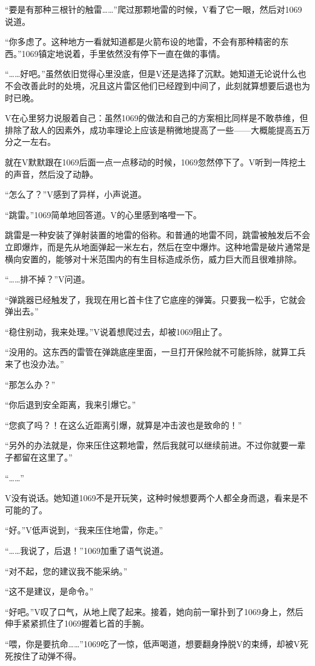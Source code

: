 “要是有那种三根针的触雷……”爬过那颗地雷的时候，V看了它一眼，然后对1069说道。

“你多虑了。这种地方一看就知道都是火箭布设的地雷，不会有那种精密的东西。”1069镇定地说着，手里依然没有停下一直在做的事情。

“……好吧。”虽然依旧觉得心里没底，但是V还是选择了沉默。她知道无论说什么也不会改善此时的处境，况且这片雷区他们已经蹚到中间了，此刻就算想要后退也为时已晚。

V在心里努力说服着自己：虽然1069的做法和自己的方案相比同样是不敢恭维，但排除了敌人的因素外，成功率理论上应该是稍微地提高了一些——大概能提高五万分之一左右。

就在V默默跟在1069后面一点一点移动的时候，1069忽然停下了。V听到一阵挖土的声音，然后没了动静。

“怎么了？”V感到了异样，小声说道。

“跳雷。”1069简单地回答道。V的心里感到咯噔一下。

跳雷是一种安装了弹射装置的地雷的俗称。和普通的地雷不同，跳雷被触发后不会立即爆炸，而是先从地面弹起一米左右，然后在空中爆炸。这种地雷是破片通常是横向安置的，能够对十米范围内的有生目标造成杀伤，威力巨大而且很难排除。

“……排不掉？”V问道。

“弹跳器已经触发了，我现在用匕首卡住了它底座的弹簧。只要我一松手，它就会弹出去。”

“稳住别动，我来处理。”V说着想爬过去，却被1069阻止了。

“没用的。这东西的雷管在弹跳底座里面，一旦打开保险就不可能拆除，就算工兵来了也没办法。”

“那怎么办？”

“你后退到安全距离，我来引爆它。”

“您疯了吗？！在这么近距离引爆，就算是冲击波也是致命的！”

“另外的办法就是，你来压住这颗地雷，然后我就可以继续前进。不过你就要一辈子都留在这里了。”

“……”

V没有说话。她知道1069不是开玩笑，这种时候想要两个人都全身而退，看来是不可能的了。

“好。”V低声说到，“我来压住地雷，你走。”

“……我说了，后退！”1069加重了语气说道。

“对不起，您的建议我不能采纳。”

“这不是建议，是命令。”

“好吧。”V叹了口气，从地上爬了起来。接着，她向前一窜扑到了1069身上，然后伸手紧紧抓住了1069握着匕首的手腕。

“喂，你是要抗命……”1069吃了一惊，低声喝道，想要翻身挣脱V的束缚，却被V死死按住了动弹不得。

